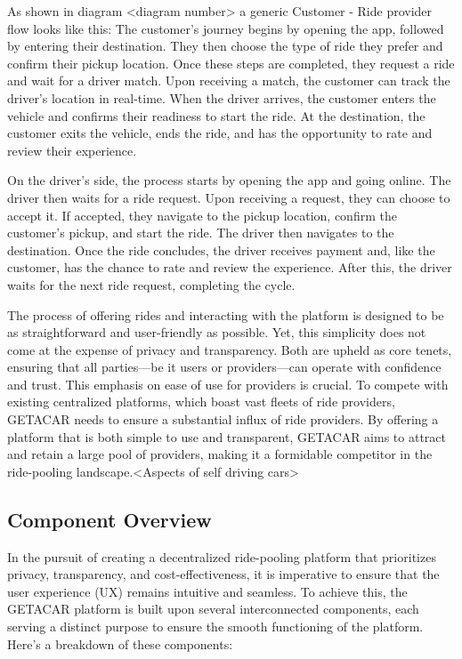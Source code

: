 As shown in diagram <diagram number> a generic Customer - Ride provider flow looks like this:
The customer's journey begins by opening the app, followed by entering their destination. They then choose the type of ride they prefer and confirm their pickup location. Once these steps are completed, they request a ride and wait for a driver match. Upon receiving a match, the customer can track the driver's location in real-time. When the driver arrives, the customer enters the vehicle and confirms their readiness to start the ride. At the destination, the customer exits the vehicle, ends the ride, and has the opportunity to rate and review their experience.

On the driver's side, the process starts by opening the app and going online. The driver then waits for a ride request. Upon receiving a request, they can choose to accept it. If accepted, they navigate to the pickup location, confirm the customer's pickup, and start the ride. The driver then navigates to the destination. Once the ride concludes, the driver receives payment and, like the customer, has the chance to rate and review the experience. After this, the driver waits for the next ride request, completing the cycle.



The process of offering rides and interacting with the platform is designed to be as straightforward and user-friendly as possible. 
Yet, this simplicity does not come at the expense of privacy and transparency. Both are upheld as core tenets, ensuring that all parties—be it users or providers—can operate with confidence and trust. This emphasis on ease of use for providers is crucial.
To compete with existing centralized platforms, which boast vast fleets of ride providers, GETACAR needs to ensure a substantial influx of ride providers. By offering a platform that is both simple to use and transparent, GETACAR aims to attract and retain a large pool of providers, making it a formidable competitor in the ride-pooling landscape.<Aspects of self driving cars>

\subsection{Component Overview}
In the pursuit of creating a decentralized ride-pooling platform that prioritizes privacy, transparency, and cost-effectiveness, it is imperative to ensure that the user experience (UX) remains intuitive and seamless. To achieve this, the GETACAR platform is built upon several interconnected components, each serving a distinct purpose to ensure the smooth functioning of the platform. Here's a breakdown of these components:

